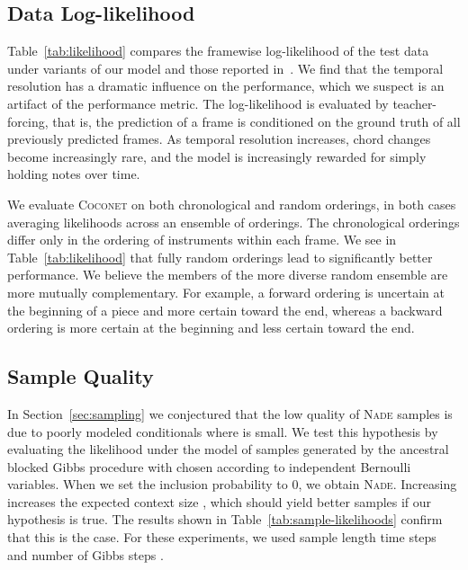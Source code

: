 \documentclass{article}
\newcommand{\coconet}{\textsc{Coconet}\xspace}
\newcommand{\nade}{\textsc{Nade}\xspace}
\begin{document}
\subsection{Data Log-likelihood}

Table~\ref{tab:likelihood} compares the framewise log-likelihood of the test data under variants of our model and those reported in~\cite{boulanger2012modeling}.
We find that the temporal resolution has a dramatic influence on the performance, which we suspect is an artifact of the performance metric. The log-likelihood is evaluated by teacher-forcing, that is, the prediction of a frame is conditioned on the ground truth of all previously predicted frames.
As temporal resolution increases, chord changes become increasingly rare, and the model is increasingly rewarded for simply holding notes over time. 

We evaluate \coconet on both chronological and random orderings, in both cases averaging likelihoods across an ensemble of  orderings.
The chronological orderings differ only in the ordering of instruments within each frame.
We see in Table~\ref{tab:likelihood} that fully random orderings lead to significantly better performance.
We believe the members of the more diverse random ensemble are more mutually complementary.
For example, a forward ordering is uncertain at the beginning of a piece and more certain toward the end, whereas a backward ordering is more certain at the beginning and less certain toward the end.

\subsection{Sample Quality} \label{sec:sample-likelihoods}

In Section~\ref{sec:sampling} we conjectured that the low quality of \nade samples
is due to poorly modeled conditionals 
where  is small.
We test this hypothesis by evaluating the likelihood under the model
of samples generated by the ancestral blocked Gibbs procedure with 
chosen according to independent Bernoulli variables.
When we set the inclusion probability  to 0, we obtain \nade.
Increasing  increases the expected context size ,
which should yield better samples if our hypothesis is true.
The results shown in Table~\ref{tab:sample-likelihoods} confirm that this is the case. 
For these experiments, we used sample length  time steps and number of Gibbs steps .
\end{document}
